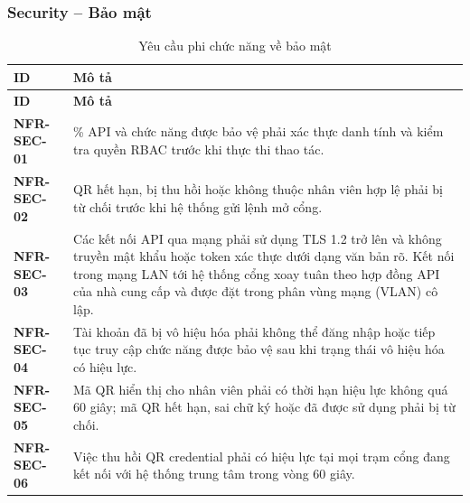 \subsubsection{Security -- Bảo mật}
\begingroup
\small
\renewcommand{\arraystretch}{1.2}
\begin{longtable}{|>{\centering\arraybackslash}m{3cm}|>{\raggedright\arraybackslash}m{12.9cm}|}
    \caption{Yêu cầu phi chức năng về bảo mật}\label{tab:nfr-security}\\
    \hline
    \textbf{ID} & \textbf{Mô tả}\\
    \hline
    \endfirsthead
    \hline
    \textbf{ID} & \textbf{Mô tả}\\
    \hline
    \endhead
    \hline
    \endfoot
    \hline
    \endlastfoot
    \textbf{NFR-SEC-01} & 100\% API và chức năng được bảo vệ phải xác thực danh tính và kiểm tra quyền RBAC trước khi thực thi thao tác.\\
    \hline
    \textbf{NFR-SEC-02} & QR hết hạn, bị thu hồi hoặc không thuộc nhân viên hợp lệ phải bị từ chối trước khi hệ thống gửi lệnh mở cổng.\\
    \hline
    \textbf{NFR-SEC-03} & Các kết nối API qua mạng phải sử dụng TLS 1.2 trở lên và không truyền mật khẩu hoặc token xác thực dưới dạng văn bản rõ. Kết nối trong mạng LAN tới hệ thống cổng xoay tuân theo hợp đồng API của nhà cung cấp và được đặt trong phân vùng mạng (VLAN) cô lập.\\
    \hline
    \textbf{NFR-SEC-04} & Tài khoản đã bị vô hiệu hóa phải không thể đăng nhập hoặc tiếp tục truy cập chức năng được bảo vệ sau khi trạng thái vô hiệu hóa có hiệu lực.\\
    \hline
    \textbf{NFR-SEC-05} & Mã QR hiển thị cho nhân viên phải có thời hạn hiệu lực không quá 60 giây; mã QR hết hạn, sai chữ ký hoặc đã được sử dụng phải bị từ chối.\\
    \hline
    \textbf{NFR-SEC-06} & Việc thu hồi QR credential phải có hiệu lực tại mọi trạm cổng đang kết nối với hệ thống trung tâm trong vòng 60 giây.\\
    \hline
\end{longtable}
\endgroup

